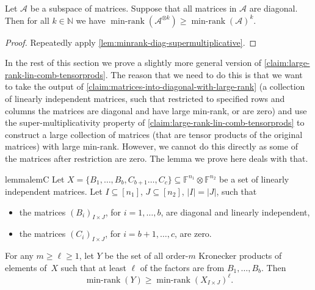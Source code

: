 \documentclass{daj}
\newcommand{\FF}{\mathbb{F}}
\newcommand{\NN}{\mathbb{N}}
\DeclareMathOperator{\minrnk}{min-rank}
\begin{document}
\begin{lemma}\label{claim:large-rank-lin-comb-tensorprods}
    Let $\mathcal{A}$ %
    be a subspace of matrices. Suppose that all matrices in $\mathcal{A}$ are diagonal. %
    Then for all $k\in\NN$ we have $\minrnk(\mathcal{A}^{\otimes k})\geq \minrnk(\mathcal{A})^k$.
\end{lemma}
\begin{proof}
    Repeatedly apply \autoref{lem:minrank-diag-supermultiplicative}.
\end{proof}
%
%

%

%

%
In the rest of this section we prove a slightly more general version of \autoref{claim:large-rank-lin-comb-tensorprods}.
The reason that we need to do this is that we want to take the output of \autoref{claim:matrices-into-diagonal-with-large-rank} (a collection of linearly independent matrices, such that restricted to specified rows and columns the matrices are diagonal and have large min-rank, or are zero) and use the super-multiplicativity property of \autoref{claim:large-rank-lin-comb-tensorprods} to construct a large collection of matrices (that are tensor products of the original matrices) with large min-rank. However, we cannot do this directly as some of the matrices after restriction are zero. The lemma we prove here deals with that.



%
%

%
\begin{restatable}{lemma}{lemC}
%
\label{claim:linear-combinations-of-mixed-tensorprods-high-rank}
    Let $X = \{B_1, \ldots, B_b, C_{b+1} \ldots, C_c\} \subseteq \FF^{n_1} \otimes \FF^{n_2}$ be a set of linearly independent matrices. Let $I\subseteq [n_1]$, $J \subseteq [n_2]$, $|I|=|J|$, such that 
    \begin{itemize}
        \item the matrices $(B_i)_{I\times J}$, for $i = 1, \ldots, b$, are diagonal and linearly independent,
        \item the matrices $(C_i)_{I\times J}$, for $i = b+1, \ldots, c$, are zero.
    \end{itemize}
    For any $m \geq \ell\geq 1$, 
    let $Y$ %
    be the set of all order-$m$ Kronecker products of elements of~$X$ such that at least $\ell$ of the factors are from $B_1, \ldots, B_b$. Then %
    \[
    \minrnk(Y) \geq \minrnk(X_{I\times J})^{\ell}.
    \]
%
\end{restatable}
 
\end{document}
